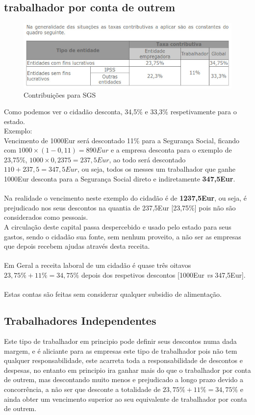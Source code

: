 \subsection{trabalhador por conta de outrem}
\begin{figure}[H]
\flushleft
\includegraphics[scale=.5]{./image/SGS/Contribuicoes_1.jpg}
\caption{Contribuições para SGS}
\end{figure}\par
Como podemos ver o cidadão desconta, 34,5\% e 33,3\% respetivamente para o estado.\\
Exemplo:\\ 
Vencimento de 1000Eur será descontado 11\% para a Segurança Social, ficando com $1000\times (1-0,11)=890Eur$ e a empresa desconta para o exemplo de 23,75\%, $1000\times 0,2375=237,5Eur$, ao todo será descontado $110+237,5=347,5Eur$, ou seja, todos os messes um trabalhador que ganhe 1000Eur desconta para a Segurança Social direto e indiretamente \textbf{347,5Eur}.\\ \\
Na realidade o vencimento neste exemplo do cidadão é de \textbf{1237,5Eur}, ou seja, é prejudicado nos seus descontos na quantia de 237,5Eur [23,75\%] pois não são considerados como pessoais.\\
A circulação deste capital passa despercebido e usado pelo estado para seus gastos, sendo o cidadão sua fonte, sem nenhum proveito, a não ser as empresas que depois recebem ajudas através desta receita.\\ \\
Em Geral a receita laboral de um cidadão é quase três oitavos $23,75\%+11\%=34,75\%$ depois dos respetivos descontos [1000Eur \textit{vs} 347,5Eur].\\ \\
Estas contas são feitas sem considerar qualquer subsidio de alimentação.
\subsection{Trabalhadores Independentes}
Este tipo de trabalhador em principio pode definir seus descontos numa dada margem, e é aliciante para as empresas este tipo de trabalhador pois não tem qualquer responsabilidade, este acarreta toda a responsabilidade de descontos e despesas, no entanto em principio ira ganhar mais do que o trabalhador por conta de outrem, mas descontando muito menos e prejudicado a longo prazo devido a concorrência, a não ser que desconte a totalidade de $23,75\%+11\%=34,75\%$ e ainda obter um vencimento superior ao seu equivalente de trabalhador por conta de outrem.
